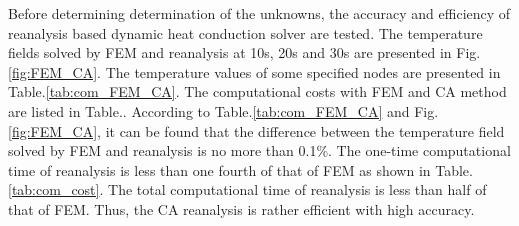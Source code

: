 \documentclass[review]{elsarticle}
\begin{document}
Before determining determination of the unknowns, the accuracy and efficiency of reanalysis based dynamic heat conduction solver are tested. The temperature fields solved by FEM and reanalysis at 10s, 20s and 30s are presented in Fig.\ref{fig:FEM_CA}. The temperature values of some specified nodes are presented in Table.\ref{tab:com_FEM_CA}. The computational costs with FEM and CA method are listed in Table.. According to Table.\ref{tab:com_FEM_CA} and Fig.\ref{fig:FEM_CA}, it can be found that the difference between the temperature field solved by FEM and reanalysis is no more than 0.1\%. The one-time computational time of reanalysis is less than one fourth of that of FEM as shown in Table.\ref{tab:com_cost}. The total computational time of reanalysis is less than half of that of FEM. Thus, the CA reanalysis is rather efficient with high accuracy.
\end{document}
